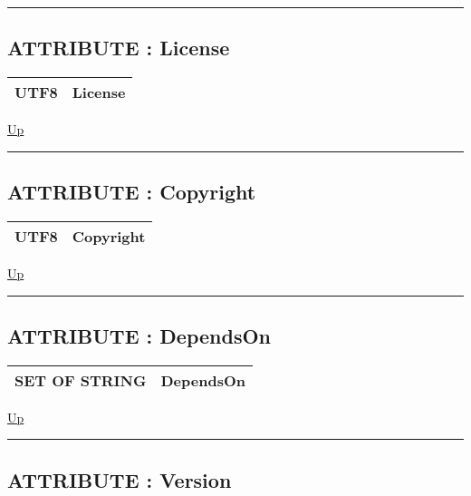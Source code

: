 \rule{\textwidth}{0.4pt}
\subsection*{ATTRIBUTE : License}
\hypertarget{ecldoc:bundlebase.license}{}

{\renewcommand{\arraystretch}{1.5}
\begin{tabularx}{\textwidth}{|>{\raggedright\arraybackslash}l|X|}
\hline
\hspace{0pt}UTF8 & License \\
\hline
\end{tabularx}
}

\hyperlink{ecldoc:BundleBase}{Up}

\par


\rule{\textwidth}{0.4pt}
\subsection*{ATTRIBUTE : Copyright}
\hypertarget{ecldoc:bundlebase.copyright}{}

{\renewcommand{\arraystretch}{1.5}
\begin{tabularx}{\textwidth}{|>{\raggedright\arraybackslash}l|X|}
\hline
\hspace{0pt}UTF8 & Copyright \\
\hline
\end{tabularx}
}

\hyperlink{ecldoc:BundleBase}{Up}

\par


\rule{\textwidth}{0.4pt}
\subsection*{ATTRIBUTE : DependsOn}
\hypertarget{ecldoc:bundlebase.dependson}{}

{\renewcommand{\arraystretch}{1.5}
\begin{tabularx}{\textwidth}{|>{\raggedright\arraybackslash}l|X|}
\hline
\hspace{0pt}SET OF STRING & DependsOn \\
\hline
\end{tabularx}
}

\hyperlink{ecldoc:BundleBase}{Up}

\par


\rule{\textwidth}{0.4pt}
\subsection*{ATTRIBUTE : Version}
\hypertarget{ecldoc:bundlebase.version}{}

